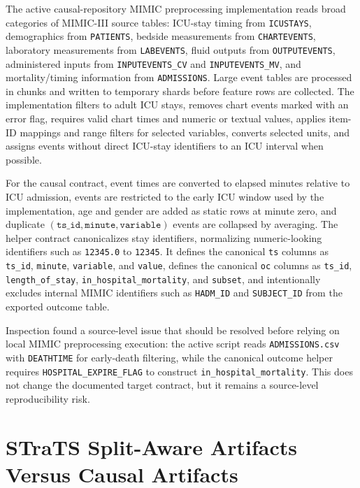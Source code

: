 The active causal-repository MIMIC preprocessing implementation reads broad categories of MIMIC-III source tables: ICU-stay timing from \texttt{ICUSTAYS}, demographics from \texttt{PATIENTS}, bedside measurements from \texttt{CHARTEVENTS}, laboratory measurements from \texttt{LABEVENTS}, fluid outputs from \texttt{OUTPUTEVENTS}, administered inputs from \texttt{INPUTEVENTS\_CV} and \texttt{INPUTEVENTS\_MV}, and mortality/timing information from \texttt{ADMISSIONS}.  Large event tables are processed in chunks and written to temporary shards before feature rows are collected.  The implementation filters to adult ICU stays, removes chart events marked with an error flag, requires valid chart times and numeric or textual values, applies item-ID mappings and range filters for selected variables, converts selected units, and assigns events without direct ICU-stay identifiers to an ICU interval when possible.

For the causal contract, event times are converted to elapsed minutes relative to ICU admission, events are restricted to the early ICU window used by the implementation, age and gender are added as static rows at minute zero, and duplicate \((\texttt{ts\_id}, \texttt{minute}, \texttt{variable})\) events are collapsed by averaging.  The helper contract canonicalizes stay identifiers, normalizing numeric-looking identifiers such as \texttt{12345.0} to \texttt{12345}.  It defines the canonical \texttt{ts} columns as \texttt{ts\_id}, \texttt{minute}, \texttt{variable}, and \texttt{value}, defines the canonical \texttt{oc} columns as \texttt{ts\_id}, \texttt{length\_of\_stay}, \texttt{in\_hospital\_mortality}, and \texttt{subset}, and intentionally excludes internal MIMIC identifiers such as \texttt{HADM\_ID} and \texttt{SUBJECT\_ID} from the exported outcome table.

Inspection found a source-level issue that should be resolved before relying on local MIMIC preprocessing execution: the active script reads \texttt{ADMISSIONS.csv} with \texttt{DEATHTIME} for early-death filtering, while the canonical outcome helper requires \texttt{HOSPITAL\_EXPIRE\_FLAG} to construct \texttt{in\_hospital\_mortality}.  This does not change the documented target contract, but it remains a source-level reproducibility risk.

\section{STraTS Split-Aware Artifacts Versus Causal Artifacts}
\label{sec:data-preprocessing:strats-split-aware-artifacts-versus-causal-artifacts}


